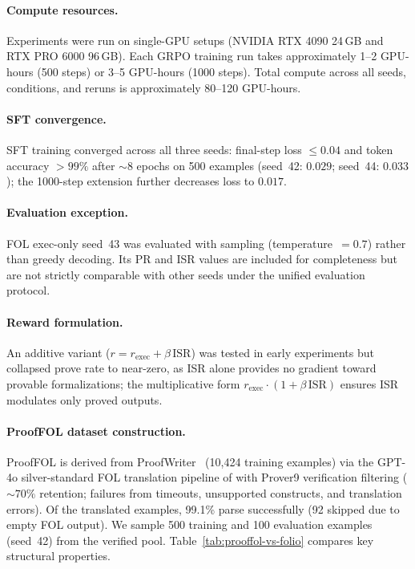 \paragraph{Compute resources.}
Experiments were run on single-GPU setups (NVIDIA RTX 4090 24\,GB and RTX PRO 6000 96\,GB).
Each GRPO training run takes approximately 1--2 GPU-hours (500 steps) or 3--5 GPU-hours (1000 steps).
Total compute across all seeds, conditions, and reruns is approximately 80--120 GPU-hours.

\paragraph{SFT convergence.}
SFT training converged across all three seeds: final-step loss ${\leq}0.04$ and token accuracy ${>}99\%$ after ${\sim}8$ epochs on 500 examples (seed~42: $0.029$; seed~44: $0.033$); the 1000-step extension further decreases loss to $0.017$.

\paragraph{Evaluation exception.}
FOL exec-only seed~43 was evaluated with sampling (temperature~$=0.7$) rather than greedy decoding.
Its PR and ISR values are included for completeness but are not strictly comparable with other seeds under the unified evaluation protocol.

\paragraph{Reward formulation.}
An additive variant ($r = r_{\text{exec}} + \beta\,\text{ISR}$) was tested in early experiments but collapsed prove rate to near-zero, as ISR alone provides no gradient toward provable formalizations; the multiplicative form $r_{\text{exec}}\cdot(1+\beta\,\text{ISR})$ ensures ISR modulates only proved outputs.

\paragraph{ProofFOL dataset construction.}
\label{app:prooffol-construction}
ProofFOL is derived from ProofWriter~\citep{proofwriter} (10{,}424 training examples) via the GPT-4o silver-standard FOL translation pipeline of \citet{prooffol-thatikonda2024} with Prover9 verification filtering (${\sim}70\%$ retention; failures from timeouts, unsupported constructs, and translation errors).
Of the translated examples, 99.1\% parse successfully (92 skipped due to empty FOL output).
We sample 500 training and 100 evaluation examples (seed~42) from the verified pool.
Table~\ref{tab:prooffol-vs-folio} compares key structural properties.

